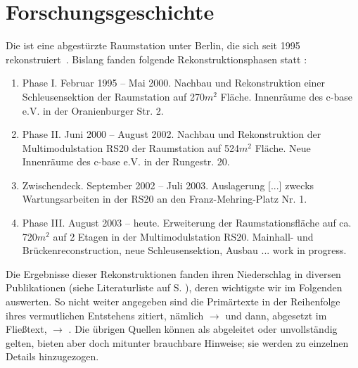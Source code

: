 \section*{Forschungsgeschichte}

    Die  ist eine abgestürzte Raumstation unter Berlin, die sich seit 1995 rekonstruiert~\cite{cbasebook}. Bislang fanden folgende Rekonstruktionsphasen statt \cite{cbasepressemap} \cite{cbasebook}:
    \begin{enumerate}
        \item Phase I.  Februar 1995 -- Mai 2000. Nachbau und Rekonstruktion einer Schleusensektion der  Raumstation auf 270$m^2$ Fläche. Innenräume des \mbox{c-base} e.V. in der Oranienburger Str. 2. \cite{cbasepressemap} \cite{cbasebook}
        \item Phase II.   Juni 2000 -- August 2002. Nachbau und Rekonstruktion der Multimodulstation RS20 der  Raumstation auf 524$m^2$ Fläche. Neue Innenräume des \mbox{c-base} e.V. in der Rungestr. 20. \cite{cbasepressemap} \cite{cbasebook}
        \item Zwischendeck.  September 2002 -- Juli 2003. Auslagerung [...] zwecks Wartungsarbeiten in der RS20 an den Franz-Mehring-Platz Nr. 1. \cite{cbasepressemap} \cite{cbasebook}
        \item Phase III.  August 2003 -- heute. Erweiterung der Raumstationsfläche auf ca. 720$m^2$ auf 2 Etagen in der Multimodulstation RS20. Mainhall- und Brückenreconstruction, neue Schleusensektion, Ausbau  ... work in progress. \cite{cbasepressemap} \cite{cbasebook}
    \end{enumerate}

Die Ergebnisse dieser Rekonstruktionen fanden ihren Niederschlag in diversen Publikationen (siehe Literaturliste auf S. \pageref{sec:literatur}), deren wichtigste wir im Folgenden auswerten. So nicht weiter angegeben sind die Primärtexte in der Reihenfolge ihres vermutlichen Entstehens zitiert, nämlich \cite{cbasewebsite} $\rightarrow$ \cite{cbasestarbasemanual} und dann, abgesetzt im Fließtext, $\rightarrow$  \cite{cbasebook}. Die übrigen Quellen können als abgeleitet oder unvollständig gelten, bieten aber doch mitunter brauchbare Hinweise; sie werden zu einzelnen Details hinzugezogen.
